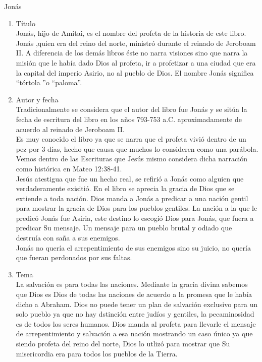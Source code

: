 %
%
\begin{section}{Jonás}
	\begin{enumerate}
		\item Título\\
			Jonás, hijo de Amitai, es el nombre del profeta de la historia de este libro. Jonás ,quien era del reino del norte, ministró durante el reinado de Jeroboam II. A diferencia de los demás libros éste no narra visiones sino que narra la misión que le había dado Dios al profeta, ir a profetizar a una ciudad que era la capital del imperio Asirio, no al pueblo de Dios. El nombre Jonás significa ``tórtola ''o ``paloma''. 
		\item Autor y fecha\\
			Tradicionalmente se considera que el autor del libro fue Jonás y se sitúa la fecha de escritura del libro en los años 793-753 a.C. aproximadamente de acuerdo al reinado de Jeroboam II.\\
			Es muy conocido el libro ya que se narra que el profeta vivió dentro de un pez por 3 días, hecho que causa que muchos lo consideren como una parábola. Vemos dentro de las Escrituras que Jesús mismo considera dicha narración como histórica en Mateo 12:38-41.\\
			Jesús atestigua que fue un hecho real, se refirió a Jonás como alguien que verdaderamente exisitió. En el libro se aprecia la gracia de Dios que se extiende a toda nación. Dios manda a Jonás a predicar a una nación gentil para mostrar la gracia de Dios para los pueblos gentiles. La nación a la que le predicó Jonás fue Asiria, este destino lo escogió Dios para Jonás, que fuera a predicar Su mensaje. Un mensaje para un pueblo brutal y odiado que destruía con saña a sus enemigos.\\
			Jonás no quería el arrepentimiento de sus enemigos sino su juicio, no quería que fueran perdonados por sus faltas.
		\item Tema\\
			La salvación es para todas las naciones. Mediante la gracia divina sabemos que Dios es Dios de todas las naciones de acuerdo a la promesa que le había dicho a Abraham. Dios no puede tener un plan de salvación exclusivo para un solo pueblo ya que no hay dstinción entre judíos y gentiles, la pecaminosidad es de todos los seres humanos. Dios manda al profeta para llevarle el mensaje de arrepentimiento y salvación a esa nación mostrando un caso único ya que siendo profeta del reino del norte, Dios lo utlizó para mostrar que Su misericordia era para todos los pueblos de la Tierra.

\end{enumerate}
\end{section}
